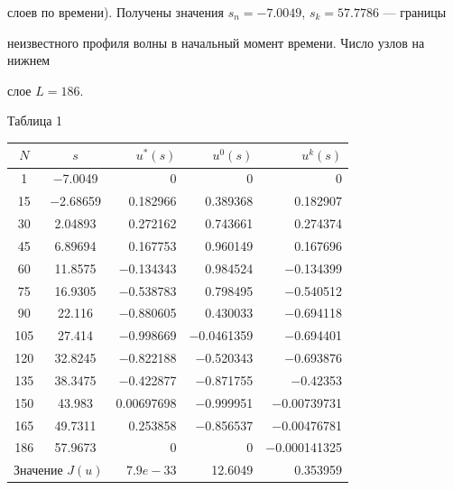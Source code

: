 слоев по времени). Получены значения $s_n=-7.0049$, $s_k=57.7786$ --- границы


неизвестного профиля волны в начальный момент времени. Число узлов на нижнем


слое $L=186$. 


\pagebreak


 


\hspace{11cm} Таблица 1


\smallskip





\begin{center}


\begin{tabular}{|c|c|r|r|r|} \hline


$N$  & $s$       & $u^*(s)$ & $u^0(s)$ & $u^k(s)$ \\ \hline


1    & $-$7.0049   & 0           & 0           & 0 \\


15   & $-$2.68659  & 0.182966    & 0.389368    & 0.182907 \\


30   & 2.04893   & 0.272162    & 0.743661    & 0.274374 \\


45   & 6.89694   & 0.167753    & 0.960149    & 0.167696 \\


60   & 11.8575   & $-$0.134343   & 0.984524    & $-$0.134399 \\


75   & 16.9305   & $-$0.538783   & 0.798495    & $-$0.540512 \\


90   & 22.116    & $-$0.880605   & 0.430033    & $-$0.694118\\


105  & 27.414    & $-$0.998669   & $-$0.0461359  & $-$0.694401 \\


120  & 32.8245   & $-$0.822188   & $-$0.520343   & $-$0.693876 \\


135  & 38.3475   & $-$0.422877   & $-$0.871755   & $-$0.42353 \\ 


150  & 43.983    & 0.00697698  & $-$0.999951   & $-$0.00739731 \\


165  & 49.7311   & 0.253858    & $-$0.856537   & $-$0.00476781 \\ 


186  & 57.9673   & 0           &  0          & $-$0.000141325\\ \hline 


\multicolumn{2}{|c|}{Значение $J(u)$}& $7.9e{-}33$ &


12.6049 & 0.353959\\ \hline


\end{tabular}


\end{center}


